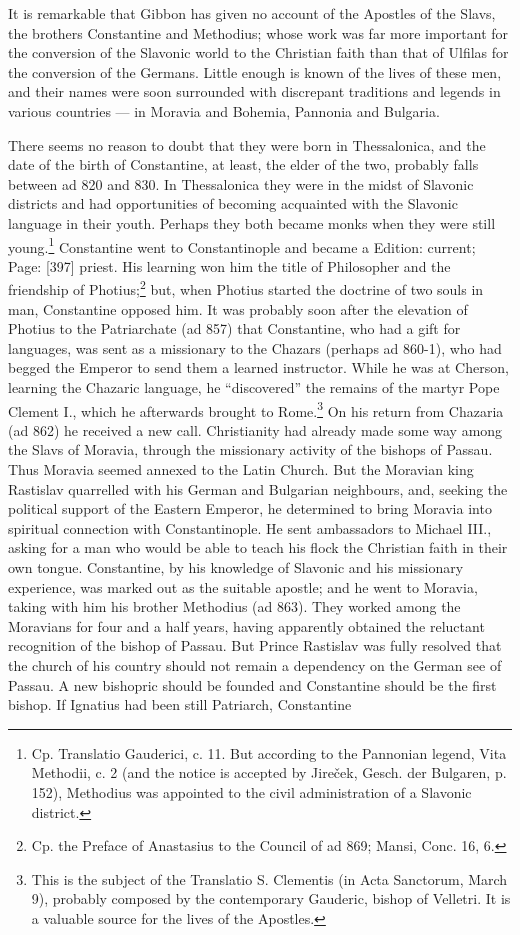 It is remarkable that Gibbon has given no account of the Apostles of the Slavs, the brothers Constantine and Methodius; whose work was far more important for the conversion of the Slavonic world to the Christian faith than that of Ulfilas for the conversion of the Germans. Little enough is known of the lives of these men, and their names were soon surrounded with discrepant traditions and legends in various countries \texthebrew{—} in Moravia and Bohemia, Pannonia and Bulgaria.

There seems no reason to doubt that they were born in Thessalonica, and the date of the birth of Constantine, at least, the elder of the two, probably falls between ad 820 and 830. In Thessalonica they were in the midst of Slavonic districts and had opportunities of becoming acquainted with the Slavonic language in their youth. Perhaps they both became monks when they were still young.\footnote{Cp. Translatio Gauderici, c. 11. But according to the Pannonian legend, Vita Methodii, c. 2 (and the notice is accepted by Jireček, Gesch. der Bulgaren, p. 152), Methodius was appointed to the civil administration of a Slavonic district.} Constantine went to Constantinople and became a Edition: current; Page: [397] priest. His learning won him the title of Philosopher and the friendship of Photius;\footnote{Cp. the Preface of Anastasius to the Council of ad 869; Mansi, Conc. 16, 6.} but, when Photius started the doctrine of two souls in man, Constantine opposed him. It was probably soon after the elevation of Photius to the Patriarchate (ad 857) that Constantine, who had a gift for languages, was sent as a missionary to the Chazars (perhaps ad 860-1), who had begged the Emperor to send them a learned instructor. While he was at Cherson, learning the Chazaric language, he \texthebrew{“}discovered\texthebrew{}” the remains of the martyr Pope Clement I., which he afterwards brought to Rome.\footnote{This is the subject of the Translatio S. Clementis (in Acta Sanctorum, March 9), probably composed by the contemporary Gauderic, bishop of Velletri. It is a valuable source for the lives of the Apostles.} On his return from Chazaria (ad 862) he received a new call. Christianity had already made some way among the Slavs of Moravia, through the missionary activity of the bishops of Passau. Thus Moravia seemed annexed to the Latin Church. But the Moravian king Rastislav quarrelled with his German and Bulgarian neighbours, and, seeking the political support of the Eastern Emperor, he determined to bring Moravia into spiritual connection with Constantinople. He sent ambassadors to Michael III., asking for a man who would be able to teach his flock the Christian faith in their own tongue. Constantine, by his knowledge of Slavonic and his missionary experience, was marked out as the suitable apostle; and he went to Moravia, taking with him his brother Methodius (ad 863). They worked among the Moravians for four and a half years, having apparently obtained the reluctant recognition of the bishop of Passau. But Prince Rastislav was fully resolved that the church of his country should not remain a dependency on the German see of Passau. A new bishopric should be founded and Constantine should be the first bishop. If Ignatius had been still Patriarch, Constantine 